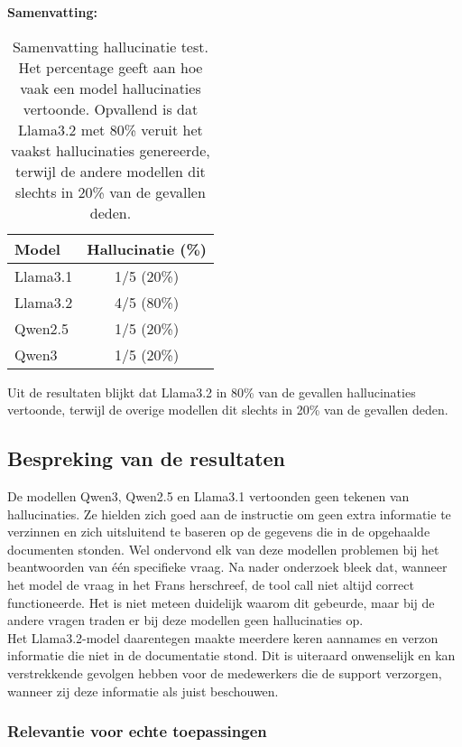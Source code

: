 \noindent\textbf{Samenvatting:}  
\begin{table}[H]
    \begin{tabular}{|l|c|}
        \hline
        \textbf{Model} & \textbf{Hallucinatie (\%)} \\
        \hline
        Llama3.1 & 1/5 (20\%) \\
        Llama3.2 & 4/5 (80\%) \\
        Qwen2.5  & 1/5 (20\%) \\
        Qwen3    & 1/5 (20\%) \\
        \hline
    \end{tabular}
    \caption{Samenvatting hallucinatie test. Het percentage geeft aan hoe vaak een model hallucinaties vertoonde. Opvallend is dat Llama3.2 met 80\% veruit het vaakst hallucinaties genereerde, terwijl de andere modellen dit slechts in 20\% van de gevallen deden.}
\end{table}

Uit de resultaten blijkt dat Llama3.2 in 80\% van de gevallen hallucinaties vertoonde, terwijl de overige modellen dit slechts in 20\% van de gevallen deden.

\subsection{Bespreking van de resultaten}

De modellen Qwen3, Qwen2.5 en Llama3.1 vertoonden geen tekenen van hallucinaties. Ze hielden zich goed aan de instructie om geen extra informatie te verzinnen en zich uitsluitend te baseren op de gegevens die in de opgehaalde documenten stonden. Wel ondervond elk van deze modellen problemen bij het beantwoorden van één specifieke vraag. Na nader onderzoek bleek dat, wanneer het model de vraag in het Frans herschreef, de tool call niet altijd correct functioneerde. Het is niet meteen duidelijk waarom dit gebeurde, maar bij de andere vragen traden er bij deze modellen geen hallucinaties op.
\\[1em]
Het Llama3.2-model daarentegen maakte meerdere keren aannames en verzon informatie die niet in de documentatie stond. Dit is uiteraard onwenselijk en kan verstrekkende gevolgen hebben voor de medewerkers die de support verzorgen, wanneer zij deze informatie als juist beschouwen.

\subsubsection{Relevantie voor echte toepassingen}

